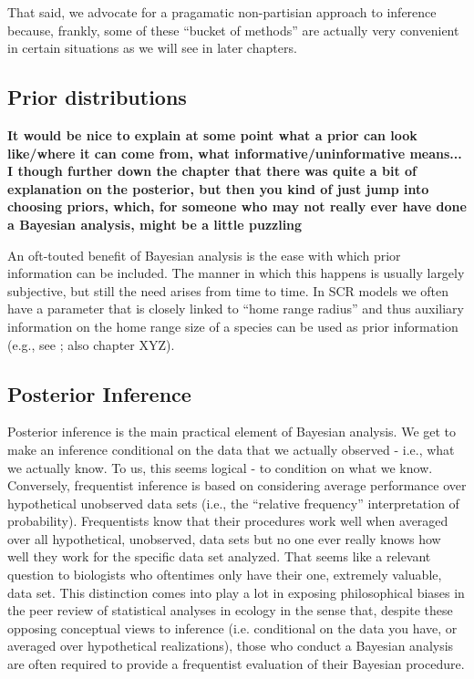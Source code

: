 That said,  we advocate for a pragamatic non-partisian approach to inference because, frankly,  some of these ``bucket of methods'' are actually very convenient in certain situations as we will see in later chapters.


\subsection{Prior distributions}
{\bf It would be nice to explain at some point what a prior can look like/where it can come from, what informative/uninformative means... I though further down the chapter that there was quite a bit of explanation on the posterior, but then you kind of just jump into choosing priors, which, for someone who may not really ever have done a Bayesian analysis, might be a little puzzling }

An oft-touted benefit of Bayesian analysis is the ease with which
prior information can be included. The manner in which this happens is
usually largely subjective, but still the need arises from time to
time. In SCR models we often have a parameter that is closely linked
to ``home range radius'' and thus auxiliary information on the home
range size of a species can be used as prior information (e.g., see
\citet{chandler_royle:2012} ; also chapter XYZ). 



\subsection{Posterior Inference}

Posterior inference is the main practical element  of Bayesian analysis. We get to make an inference conditional on the data that we actually observed - i.e., what we actually know.  To us, this seems logical - to condition on what we know. Conversely, frequentist inference is based on considering average performance over hypothetical unobserved data sets (i.e., the ``relative frequency'' interpretation of probability).  Frequentists know that their procedures work well when averaged over all hypothetical, unobserved, data sets but no one ever really knows how well they work for the specific data set analyzed. That seems like a relevant question to biologists who oftentimes only have their one, extremely valuable, data set.
This distinction comes into play a lot in exposing philosophical biases in the peer review of statistical analyses in ecology in the sense that, despite these opposing conceptual views to inference (i.e. conditional on the data you have, or averaged over hypothetical realizations), those who conduct a Bayesian analysis are often required to provide a frequentist evaluation of their Bayesian procedure.  

